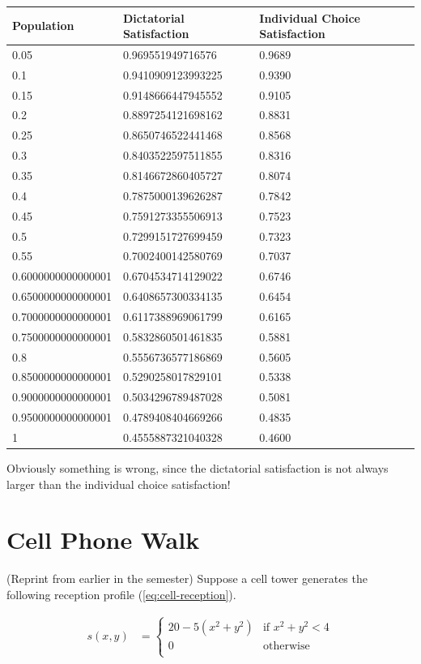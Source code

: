 \documentclass{article}
\begin{document}
\begin{tabular}{l | l | l }
Population & Dictatorial Satisfaction & Individual Choice Satisfaction\\
\hline
0.05&0.969551949716576 & 0.9689\\
0.1&0.9410909123993225 & 0.9390\\
0.15&0.9148666447945552 & 0.9105 \\
0.2&0.8897254121698162 & 0.8831 \\
0.25&0.8650746522441468 & 0.8568\\
0.3&0.8403522597511855 & 0.8316 \\
0.35&0.8146672860405727 & 0.8074 \\
0.4&0.7875000139626287 & 0.7842 \\
0.45&0.7591273355506913 & 0.7523 \\
0.5&0.7299151727699459 & 0.7323 \\
0.55&0.7002400142580769 & 0.7037 \\
0.6000000000000001&0.6704534714129022 & 0.6746 \\
0.6500000000000001&0.6408657300334135 & 0.6454 \\
0.7000000000000001&0.6117388969061799 & 0.6165 \\
0.7500000000000001&0.5832860501461835 & 0.5881 \\
0.8&0.5556736577186869 & 0.5605\\
0.8500000000000001&0.5290258017829101 & 0.5338 \\
0.9000000000000001&0.5034296789487028 & 0.5081 \\
0.9500000000000001&0.4789408404669266 & 0.4835 \\
1&0.4555887321040328 & 0.4600 \\
\end{tabular}

Obviously something is wrong, since the dictatorial satisfaction is not always
	larger than the individual choice satisfaction!

\section{Cell Phone Walk}

(Reprint from earlier in the semester)
Suppose a cell tower generates the following reception profile 
	(\ref{eq:cell-reception}).

\begin{align}
s(x,y) & = \begin{cases}
	20 - 5 (x^2 + y^2) & \text{if $x^2 + y^2 < 4$} \\ 
	0 & \text{otherwise} \\ \end{cases} \label{eq:cell-reception}
\end{align}
\end{document}
